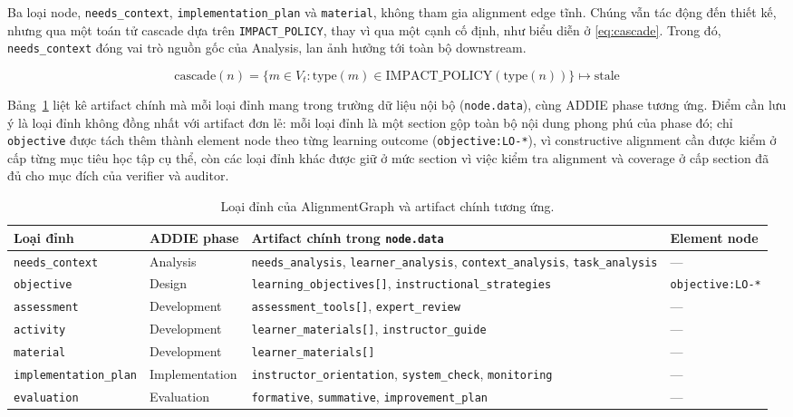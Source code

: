 \documentclass[../main.tex]{subfiles}
\begin{document}
Ba loại node, \texttt{needs\_context}, \texttt{implementation\_plan} và \texttt{material}, không tham gia alignment edge tĩnh. Chúng vẫn tác động đến thiết kế, nhưng qua một toán tử cascade dựa trên \texttt{IMPACT\_POLICY}, thay vì qua một cạnh cố định, như biểu diễn ở \eqref{eq:cascade}. Trong đó, \texttt{needs\_context} đóng vai trò nguồn gốc của Analysis, lan ảnh hưởng tới toàn bộ downstream.

\begin{equation}\label{eq:cascade}
\text{cascade}(n) = \{ m \in V_t : \text{type}(m) \in \text{IMPACT\_POLICY}(\text{type}(n)) \} \mapsto \text{stale}
\end{equation}

Bảng~\ref{tab:node-types} liệt kê artifact chính mà mỗi loại đỉnh mang trong trường dữ liệu nội bộ (\texttt{node.data}), cùng ADDIE phase tương ứng. Điểm cần lưu ý là loại đỉnh không đồng nhất với artifact đơn lẻ: mỗi loại đỉnh là một section gộp toàn bộ nội dung phong phú của phase đó; chỉ \texttt{objective} được tách thêm thành element node theo từng learning outcome (\texttt{objective:LO-*}), vì constructive alignment cần được kiểm ở cấp từng mục tiêu học tập cụ thể, còn các loại đỉnh khác được giữ ở mức section vì việc kiểm tra alignment và coverage ở cấp section đã đủ cho mục đích của verifier và auditor.

\begin{table}[H]
\centering
\footnotesize
\caption{Loại đỉnh của AlignmentGraph và artifact chính tương ứng.}
\label{tab:node-types}
\begin{tabular}{p{2.4cm}p{2.0cm}p{6.2cm}p{2.2cm}}
\hline
\textbf{Loại đỉnh} & \textbf{ADDIE phase} & \textbf{Artifact chính trong \texttt{node.data}} & \textbf{Element node} \\
\hline
\texttt{needs\_context} & Analysis & \texttt{needs\_analysis}, \texttt{learner\_analysis}, \texttt{context\_analysis}, \texttt{task\_analysis} & --- \\
\texttt{objective} & Design & \texttt{learning\_objectives[]}, \texttt{instructional\_strategies} & \texttt{objective:LO-*} \\
\texttt{assessment} & Development & \texttt{assessment\_tools[]}, \texttt{expert\_review} & --- \\
\texttt{activity} & Development & \texttt{learner\_materials[]}, \texttt{instructor\_guide} & --- \\
\texttt{material} & Development & \texttt{learner\_materials[]} & --- \\
\texttt{implementation\_plan} & Implementation & \texttt{instructor\_orientation}, \texttt{system\_check}, \texttt{monitoring} & --- \\
\texttt{evaluation} & Evaluation & \texttt{formative}, \texttt{summative}, \texttt{improvement\_plan} & --- \\
\hline
\end{tabular}
\end{table}
\end{document}
